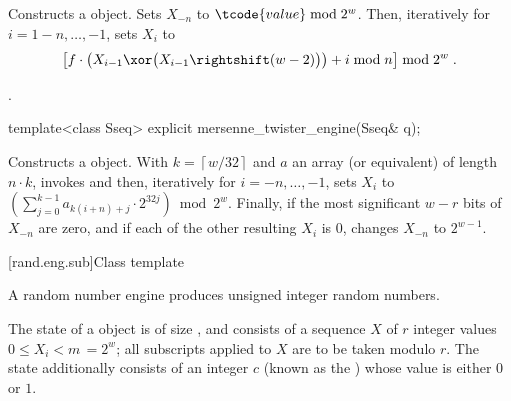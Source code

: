 \begin{itemdescr}
\pnum\effects Constructs a  object.
Sets $X_{-n}$ to $\tcode{value} \bmod 2^w$.
Then, iteratively for $i = 1 - n, \dotsc, -1$, sets $X_i$ to
\[%
 \bigl[f \cdot
       \bigl(X_{i-1} \xor \bigl(X_{i-1} \rightshift (w-2)\bigr)
       \bigr)
       + i \bmod n
 \bigr] \bmod 2^w
\; \mbox{.}
\]%

\pnum\complexity {}.
\end{itemdescr}

%
\begin{itemdecl}
template<class Sseq> explicit mersenne_twister_engine(Sseq& q);
\end{itemdecl}

\begin{itemdescr}
\pnum\effects Constructs a  object.
 With
 $k = \left\lceil w / 32 \right\rceil$
 and $a$ an array (or equivalent)
 of length $n \cdot k$,
 invokes 
 and then, iteratively for $i = -n,\dotsc,-1$,
 sets $X_i$
 to $\left(\sum_{j=0}^{k-1}a_{k(i+n)+j} \cdot 2^{32j} \right) \bmod 2^w$.
 Finally,
 if the most significant $w-r$ bits of $X_{-n}$
 are zero,
 and if each of the other resulting $X_i$ is $0$,
 changes $X_{-n}$
 to $ 2^{w-1} $.
\end{itemdescr}


[rand.eng.sub]{Class template }%
%

\pnum
A  random number engine
produces unsigned integer random numbers.

\pnum
The state%
%
of a  object 
is of size
,
and consists of
a sequence $X$ of $r$ integer values $0 \leq X_i < m \,= 2^w$;
all subscripts applied to $X$ are to be taken modulo $r$.
The state 
additionally consists of an integer $c$
(known as the )%
%
whose value is either $0$ or $1$.

